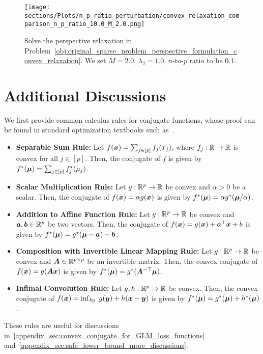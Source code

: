 \begin{figure*}[!ht]
    \centering
    \texttt{[image: sections/Plots/n\_p\_ratio\_perturbation/convex\_relaxation\_comparison\_n\_p\_ratio\_10.0\_M\_2.0.png]}
    \caption{Solve the perspective relaxation in Problem~\eqref{obj:original_sparse_problem_perspective_formulation_convex_relaxation}.
    We set $M=2.0$, $\lambda_2=1.0$, $n$-to-$p$ ratio to be 0.1.}
    \label{fig:solve_convex_relaxation_M_2.0_lambda2_1.0_n_p_ratio_0.1}
\end{figure*}

\newpage

\section{Additional Discussions}
We first provide common calculus rules for conjugate functions, whose proof can be found in standard optimization textbooks such as~\citep{beck2017first}.

\begin{itemize}[label=$\diamond$,leftmargin=*]
    \item \textbf{Separable Sum Rule:} Let $f(\bm{x}) = \sum_{j \in [p]} f_j(x_j)$, where $f_j: \mathbb{R} \rightarrow \mathbb{R}$ is convex for all $j \in [p]$. Then, the conjugate of $f$ is given by $f^*(\bm{\mu}) = \sum_{j \in [p]} f_j^*(\mu_j)$.
    
    \item \textbf{Scalar Multiplication Rule:}  Let $g : \mathbb{R}^p \to \mathbb{R}$ be convex and $\alpha > 0$ be a scalar. Then, the conjugate of $f(\bm{x}) = \alpha g(\bm{x})$ is given by $f^*(\bm{\mu}) = \alpha g^*(\bm{\mu}/\alpha)$.
    
    \item \textbf{Addition to Affine Function Rule:} Let $g : \mathbb{R}^p \to \mathbb{R}$ be convex and $\bm{a}, \bm{b} \in \mathbb{R}^p$ be two vectors. Then, the conjugate of $f(\bm{x}) = g(\bm{x}) + \bm{a}^\top\bm{x} + b$ is given by $f^*(\bm{\mu}) = g^*(\bm{\mu} - \bm{a}) - \bm{b}$.
    
    \item \textbf{Composition with Invertible Linear Mapping Rule:} Let $g : \mathbb{R}^p \to \mathbb{R}$ be convex and $\bm{A} \in \mathbb{R}^{p \times p}$ be an invertible matrix. Then, the convex conjugate of $f(\bm{x}) = g(\bm{A} \bm{x})$ is given by $f^*(\bm{\mu}) = g^*(\bm{A}^{-\top} \bm{\mu})$.
    
    \item \textbf{Infimal Convolution Rule:} Let $g, h : \mathbb{R}^p \to \mathbb{R}$ be convex. Then, the convex conjugate of $f(\bm{x}) = \inf_{by} ~ g(\bm{y}) + h(\bm{x} - \bm{y})$ is given by $f^*(\bm{\mu}) = g^*(\bm{\mu}) + h^*(\bm{\mu})$.
\end{itemize}
These rules are useful for discussions in~\ref{appendix_sec:convex_conjugate_for_GLM_loss_functions} and~\ref{appendix_sec:safe_lower_bound_more_discussions}.


